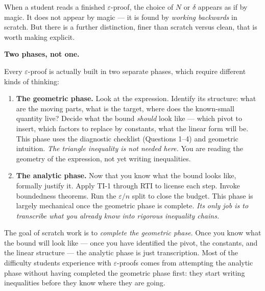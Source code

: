 When a student reads a finished $\varepsilon$-proof, the choice of $N$
or $\delta$ appears as if by magic.
It does not appear by magic — it is found by \emph{working backwards}
in scratch.
But there is a further distinction, finer than scratch versus clean,
that is worth making explicit.

\medskip

\noindent\textbf{Two phases, not one.}

Every $\varepsilon$-proof is actually built in two separate phases,
which require different kinds of thinking:

\begin{enumerate}
  \item \textbf{The geometric phase.}
        Look at the expression.
        Identify its structure: what are the moving parts, what is the
        target, where does the known-small quantity live?
        Decide what the bound \emph{should} look like —
        which pivot to insert, which factors to replace by constants,
        what the linear form will be.
        This phase uses the diagnostic checklist (Questions 1--4)
        and geometric intuition.
        \emph{The triangle inequality is not needed here.}
        You are reading the geometry of the expression, not yet
        writing inequalities.

  \item \textbf{The analytic phase.}
        Now that you know what the bound looks like, formally justify it.
        Apply TI-1 through RTI to license each step.
        Invoke boundedness theorems.
        Run the $\varepsilon/n$ split to close the budget.
        This phase is largely mechanical once the geometric phase
        is complete.
        \emph{Its only job is to transcribe what you already know
        into rigorous inequality chains.}
\end{enumerate}

\medskip

The goal of scratch work is to \emph{complete the geometric phase}.
Once you know what the bound will look like — once you have identified
the pivot, the constants, and the linear structure — the analytic phase
is just transcription.
Most of the difficulty students experience with $\varepsilon$-proofs
comes from attempting the analytic phase without having completed the
geometric phase first: they start writing inequalities before they know
where they are going.

\medskip

